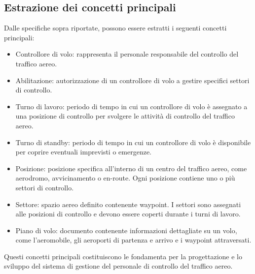 \subsection{Estrazione dei concetti principali}
Dalle specifiche sopra riportate, possono essere estratti i seguenti concetti principali:

\begin{itemize}
\item Controllore di volo: rappresenta il personale responsabile del controllo del traffico aereo.
\item Abilitazione: autorizzazione di un controllore di volo a gestire specifici settori di controllo.
\item Turno di lavoro: periodo di tempo in cui un controllore di volo è assegnato a una posizione di controllo per svolgere le attività di controllo del traffico aereo.
\item Turno di standby: periodo di tempo in cui un controllore di volo è disponibile per coprire eventuali imprevisti o emergenze.
\item Posizione: posizione specifica all'interno di un centro del traffico aereo, come aerodromo, avvicinamento o en-route. Ogni posizione contiene uno o più settori di controllo.
\item Settore: spazio aereo definito contenente waypoint. I settori sono assegnati alle posizioni di controllo e devono essere coperti durante i turni di lavoro.
\item Piano di volo: documento contenente informazioni dettagliate su un volo, come l'aeromobile, gli aeroporti di partenza e arrivo e i waypoint attraversati.
\end{itemize}

Questi concetti principali costituiscono le fondamenta per la progettazione e lo sviluppo del sistema di gestione del personale di controllo del traffico aereo.
